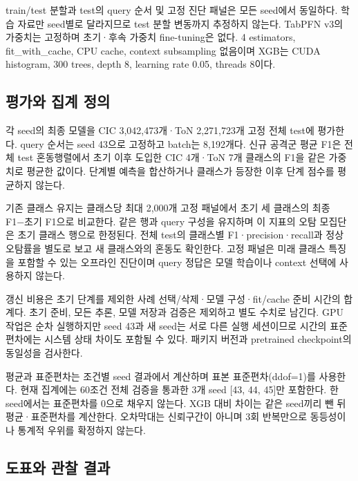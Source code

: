 train/\allowbreak{}test 분할과 test의 query 순서 및 고정 진단 패널은 모든 seed에서 동일하다. 학습 자료만 seed별로 달라지므로 test 분할 변동까지 추정하지 않는다. TabPFN v3의 가중치는 고정하며 초기·후속 가중치 fine-tuning은 없다. 4 estimators, fit\_\allowbreak{}with\_\allowbreak{}cache, CPU cache, context subsampling 없음이며 XGB는 CUDA histogram, 300 trees, depth 8, learning rate 0.05, threads 8이다.

\subsection{평가와 집계 정의}
각 seed의 최종 모델을 CIC 3,042,473개·ToN 2,271,723개 고정 전체 test에 평가한다. query 순서는 seed 43으로 고정하고 batch는 8,192개다. 신규 공격군 평균 F1은 전체 test 혼동행렬에서 초기 이후 도입한 CIC 4개·ToN 7개 클래스의 F1을 같은 가중치로 평균한 값이다. 단계별 예측을 합산하거나 클래스가 등장한 이후 단계 점수를 평균하지 않는다.

기존 클래스 유지는 클래스당 최대 2,000개 고정 패널에서 초기 세 클래스의 최종 F1−초기 F1으로 비교한다. 같은 행과 query 구성을 유지하며 이 지표의 오탐 모집단은 초기 클래스 행으로 한정된다. 전체 test의 클래스별 F1·precision·recall과 정상 오탐률을 별도로 보고 새 클래스와의 혼동도 확인한다. 고정 패널은 미래 클래스 특징을 포함할 수 있는 오프라인 진단이며 query 정답은 모델 학습이나 context 선택에 사용하지 않는다.

갱신 비용은 초기 단계를 제외한 사례 선택/\allowbreak{}삭제·모델 구성·fit/\allowbreak{}cache 준비 시간의 합계다. 초기 준비, 모든 추론, 모델 저장과 검증은 제외하고 별도 수치로 남긴다. GPU 작업은 순차 실행하지만 seed 43과 새 seed는 서로 다른 실행 세션이므로 시간의 표준편차에는 시스템 상태 차이도 포함될 수 있다. 패키지 버전과 pretrained checkpoint의 동일성을 검사한다.

평균과 표준편차는 조건별 seed 결과에서 계산하며 표본 표준편차(ddof=\allowbreak{}1)를 사용한다. 현재 집계에는 60조건 전체 검증을 통과한 3개 seed [43, 44, 45]만 포함한다. 한 seed에서는 표준편차를 0으로 채우지 않는다. XGB 대비 차이는 같은 seed끼리 뺀 뒤 평균·표준편차를 계산한다. 오차막대는 신뢰구간이 아니며 3회 반복만으로 동등성이나 통계적 우위를 확정하지 않는다.

\subsection{도표와 관찰 결과}




